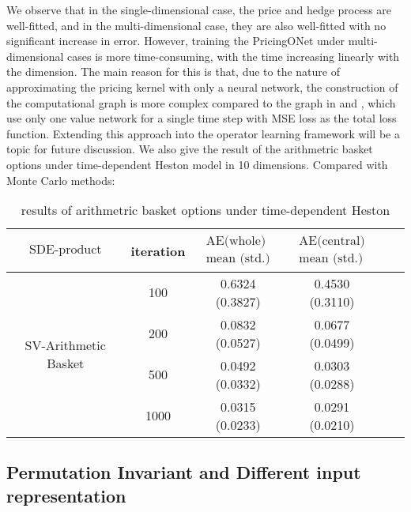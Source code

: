 \documentclass[11pt,a4paper]{article}
\theoremstyle{remark}
\begin{document}
	We observe that in the single-dimensional case, the price and hedge process are well-fitted, and in the multi-dimensional case, they are also well-fitted with no significant increase in error. However, training the PricingONet under multi-dimensional cases is more time-consuming, with the time increasing linearly with the dimension. The main reason for this is that, due to the nature of approximating the pricing kernel with only a neural network, the construction of the computational graph is more complex compared to the graph in \cite{han2017deep} and \cite{beck2021deep}, which use only one value network for a single time step with MSE loss as the total loss function. Extending this approach into the operator learning framework will be a topic for future discussion. We also give the result of the arithmetric basket options under time-dependent Heston model in 10 dimensions. Compared with Monte Carlo methods:
	\begin{table}[H]
		\centering
		\begin{tabular}{cccccc}
			\hline$\text{SDE-product}$ & iteration & $\begin{array}{c}\text{AE(whole)} \\
				\text{mean (std.)} \end{array}$   & $\begin{array}{c}\text{AE(central)} \\
				\text{mean (std.)} \end{array}$  \\
			\hline \multirow{4}{*}{SV-Arithmetic Basket} & 100 & 0.6324 (0.3827) & 0.4530 (0.3110) \\
			& 200 & 0.0832 (0.0527) & 0.0677 (0.0499) \\
			& 500 & 0.0492 (0.0332)  & 0.0303 (0.0288) \\
			& 1000 & 0.0315 (0.0233) & 0.0291 (0.0210) \\
			
			
			\hline
		\end{tabular}
		
		\caption{results of arithmetric basket options under time-dependent Heston }
		\label{tab:my_label}
	\end{table}
	\subsection{Permutation Invariant and Different input representation}
	
\end{document}
